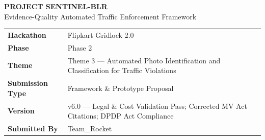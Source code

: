 \documentclass[11pt,a4paper]{article}
\begin{document}
\vspace{1em}
\begin{center}
    {\Huge\bfseries\color{sentinelblue} PROJECT SENTINEL-BLR}\\[0.5em]
    {\large\color{gray} Evidence-Quality Automated Traffic Enforcement Framework}\\[1.2em]
\vspace{2em}
    \begin{tabular}{L{3.5cm} L{11cm}}
        \toprule
        \\
        \midrule
        \textbf{Hackathon}       & Flipkart Gridlock 2.0 \\
        \textbf{Phase}           & Phase 2 \\
        \textbf{Theme}           & Theme 3 — Automated Photo Identification and Classification for Traffic Violations \\
        \textbf{Submission Type} & Framework \& Prototype Proposal \\
        \textbf{Version}         & v6.0 --- Legal \& Cost Validation Pass; Corrected MV Act Citations; DPDP Act Compliance \\
        \textbf{Submitted By}    & Team\_Rocket \\
        \bottomrule
    \end{tabular}
\end{center}

\vspace{0.8em}
\end{document}
